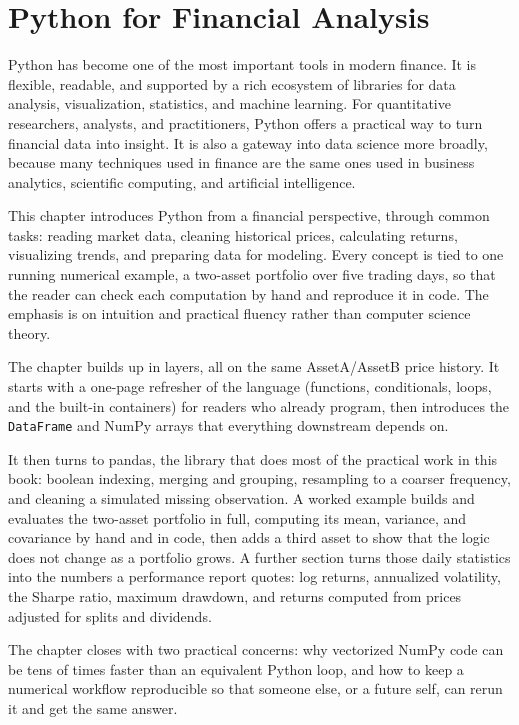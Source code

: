 \documentclass[../ai_in_finance]{subfiles}
\begin{document}
\chapter{Python for Financial Analysis}

Python has become one of the most important tools in modern finance. It is flexible, readable, and supported by a rich ecosystem of libraries for data analysis, visualization, statistics, and machine learning. For quantitative researchers, analysts, and practitioners, Python offers a practical way to turn financial data into insight. It is also a gateway into data science more broadly, because many techniques used in finance are the same ones used in business analytics, scientific computing, and artificial intelligence.

This chapter introduces Python from a financial perspective, through common tasks: reading market data, cleaning historical prices, calculating returns, visualizing trends, and preparing data for modeling. Every concept is tied to one running numerical example, a two-asset portfolio over five trading days, so that the reader can check each computation by hand and reproduce it in code. The emphasis is on intuition and practical fluency rather than computer science theory.

The chapter builds up in layers, all on the same AssetA/AssetB price history. It starts with a one-page refresher of the language (functions, conditionals, loops, and the built-in containers) for readers who already program, then introduces the \texttt{DataFrame} and NumPy arrays that everything downstream depends on.

It then turns to pandas, the library that does most of the practical work in this book: boolean indexing, merging and grouping, resampling to a coarser frequency, and cleaning a simulated missing observation. A worked example builds and evaluates the two-asset portfolio in full, computing its mean, variance, and covariance by hand and in code, then adds a third asset to show that the logic does not change as a portfolio grows. A further section turns those daily statistics into the numbers a performance report quotes: log returns, annualized volatility, the Sharpe ratio, maximum drawdown, and returns computed from prices adjusted for splits and dividends.

The chapter closes with two practical concerns: why vectorized NumPy code can be tens of times faster than an equivalent Python loop, and how to keep a numerical workflow reproducible so that someone else, or a future self, can rerun it and get the same answer.
\end{document}
